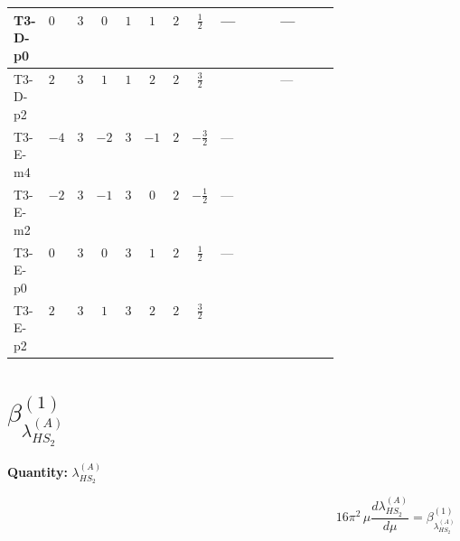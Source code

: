 \documentclass[8pt]{article}
\begin{document}
\begin{landscape}
\begin{longtable}{@{}llcccccc >{\raggedright\arraybackslash}p{0.21\linewidth} >{\raggedright\arraybackslash}p{0.21\linewidth}@{}}
\midrule
T3-D-p0 & $0$ & $3$ & $0$ & $1$ & $1$ & $2$ & $\frac{1}{2}$ & --- & --- \\
\midrule
T3-D-p2 & $2$ & $3$ & $1$ & $1$ & $2$ & $2$ & $\frac{3}{2}$ & \scriptsize\adjustbox{max width=\linewidth}{$\begin{gathered} +{g_1}^2 \left(4 {g_2}^2-\frac{15 {\lambda_{HS_1}^{(A)}}}{2}\right)\end{gathered}$} & --- \\
\midrule
T3-E-m4 & $-4$ & $3$ & $-2$ & $3$ & $-1$ & $2$ & $-\frac{3}{2}$ & --- & \scriptsize\adjustbox{max width=\linewidth}{$\begin{gathered} +12 {\lambda_{12}^{(A)}} {\lambda_{HS_2}^{(A)}}\end{gathered}$} \\
\midrule
T3-E-m2 & $-2$ & $3$ & $-1$ & $3$ & $0$ & $2$ & $-\frac{1}{2}$ & --- & \scriptsize\adjustbox{max width=\linewidth}{$\begin{gathered} +12 {\lambda_{12}^{(A)}} {\lambda_{HS_2}^{(A)}}\end{gathered}$} \\
\midrule
T3-E-p0 & $0$ & $3$ & $0$ & $3$ & $1$ & $2$ & $\frac{1}{2}$ & --- & \scriptsize\adjustbox{max width=\linewidth}{$\begin{gathered} +12 {\lambda_{12}^{(A)}} {\lambda_{HS_2}^{(A)}}\end{gathered}$} \\
\midrule
T3-E-p2 & $2$ & $3$ & $1$ & $3$ & $2$ & $2$ & $\frac{3}{2}$ & \scriptsize\adjustbox{max width=\linewidth}{$\begin{gathered} +{g_1}^2 \left(4 {g_2}^2-\frac{15 {\lambda_{HS_1}^{(A)}}}{2}\right)\end{gathered}$} & \scriptsize\adjustbox{max width=\linewidth}{$\begin{gathered} +12 {\lambda_{12}^{(A)}} {\lambda_{HS_2}^{(A)}}\end{gathered}$} \\
\midrule
\bottomrule
\end{longtable}
\clearpage
\section*{$\beta_{\lambda_{HS_2}^{(A)}}^{(1)}$}
\noindent\textbf{Quantity: }$\lambda_{HS_2}^{(A)}$\par\smallskip
\[16\pi^2\,\mu\frac{d \lambda_{HS_2}^{(A)}}{d\mu}=\beta_{\lambda_{HS_2}^{(A)}}^{(1)}\]

\end{landscape}
\end{document}
